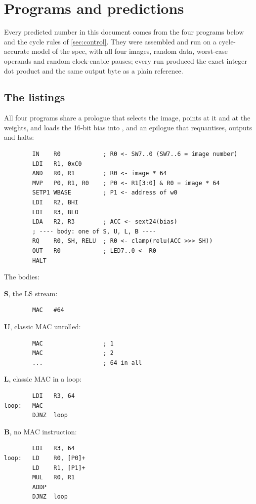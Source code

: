\section{Programs and predictions}\label{sec:programs}

Every predicted number in this document comes from the four programs below and the cycle rules of \cref{sec:control}. They were assembled and run on a cycle-accurate model of the spec, with all four images, random data, worst-case operands and random clock-enable pauses; every run produced the exact integer dot product and the same output byte as a plain reference.

\subsection{The listings}

All four programs share a prologue that selects the image, points  at it and  at the weights, and loads the 16-bit bias into , and an epilogue that requantises, outputs and halts:

\begin{lstlisting}
        IN    R0            ; R0 <- SW7..0 (SW7..6 = image number)
        LDI   R1, 0xC0
        AND   R0, R1        ; R0 <- image * 64
        MVP   P0, R1, R0    ; P0 <- R1[3:0] & R0 = image * 64
        SETP1 WBASE         ; P1 <- address of w0
        LDI   R2, BHI
        LDI   R3, BLO
        LDA   R2, R3        ; ACC <- sext24(bias)
        ; ---- body: one of S, U, L, B ----
        RQ    R0, SH, RELU  ; R0 <- clamp(relu(ACC >>> SH))
        OUT   R0            ; LED7..0 <- R0
        HALT
\end{lstlisting}

The bodies:

\begin{minipage}[t]{0.47\linewidth}
\textbf{S}, the LS stream:
\begin{lstlisting}
        MAC   #64
\end{lstlisting}
\textbf{U}, classic MAC unrolled:
\begin{lstlisting}
        MAC                 ; 1
        MAC                 ; 2
        ...                 ; 64 in all
\end{lstlisting}
\end{minipage}\hfill
\begin{minipage}[t]{0.49\linewidth}
\textbf{L}, classic MAC in a loop:
\begin{lstlisting}
        LDI   R3, 64
loop:   MAC
        DJNZ  loop
\end{lstlisting}
\textbf{B}, no MAC instruction:
\begin{lstlisting}
        LDI   R3, 64
loop:   LD    R0, [P0]+
        LD    R1, [P1]+
        MUL   R0, R1
        ADDP
        DJNZ  loop
\end{lstlisting}
\end{minipage}

